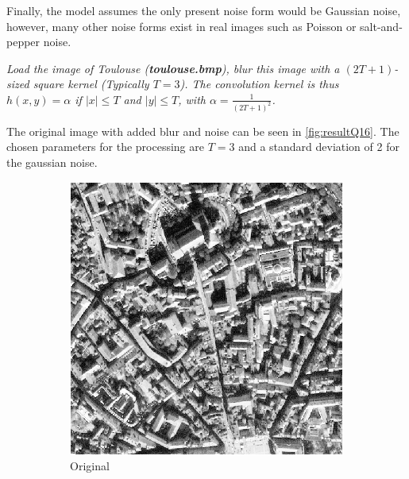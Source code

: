 Finally, the model assumes the only present noise form would be Gaussian noise, however, many other noise forms exist in real images such as Poisson or salt-and-pepper noise.

\textit{Load the image of Toulouse (\textbf{toulouse.bmp}), blur this image with a $(2T+1)$-sized square kernel (Typically $T = 3$). The convolution kernel is thus $h(x,y) = \alpha$ if $|x| \leq T$ and $|y| \leq T$, with $\alpha = \frac{1}{(2T+1)^2}$.
}

The original image with added blur and noise can be seen in \autoref{fig:resultQ16}. The chosen parameters for the processing are $T=3$ and a standard deviation of 2 for the gaussian noise.

\begin{figure}[!ht]
    \centering
    \begin{subfigure}{0.32\textwidth}
        \centering
        \includegraphics[width=\textwidth]{Doc/Graphics/Part1/Q17_Original.png}
        \caption{Original}
    \end{subfigure}
    \hfill
    \begin{subfigure}{0.32\textwidth}
        \centering

\end{subfigure}
\end{figure}
